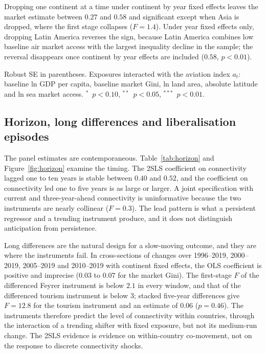 \documentclass[12pt]{article}
\newcommand{\sym}[1]{\ensuremath{^{#1}}}
\begin{document}
Dropping one continent at a time under continent by year fixed effects leaves the market estimate between $0.27$ and $0.58$ and significant except when Asia is dropped, where the first stage collapses ($F=1.4$). Under year fixed effects only, dropping Latin America reverses the sign, because Latin America combines low baseline air market access with the largest inequality decline in the sample; the reversal disappears once continent by year effects are included ($0.58$, $p<0.01$).

\begin{table}[H]\centering\caption{Identification diagnostics for the shift-share instruments.}\label{tab:diag}
\begin{threeparttable}\small
\begin{tablenotes}\footnotesize\item Robust SE in parentheses. Exposures interacted with the aviation index $a_t$: baseline ln GDP per capita, baseline market Gini, ln land area, absolute latitude and ln sea market access. \sym{*}~$p<0.10$, \sym{**}~$p<0.05$, \sym{***}~$p<0.01$.\end{tablenotes}\end{threeparttable}\end{table}

\subsection{Horizon, long differences and liberalisation episodes}
\label{sec:horizon}
The panel estimates are contemporaneous. Table~\ref{tab:horizon} and Figure~\ref{fig:horizon} examine the timing. The 2SLS coefficient on connectivity lagged one to ten years is stable between $0.40$ and $0.52$, and the coefficient on connectivity led one to five years is as large or larger. A joint specification with current and three-year-ahead connectivity is uninformative because the two instruments are nearly collinear ($F=0.3$). The lead pattern is what a persistent regressor and a trending instrument produce, and it does not distinguish anticipation from persistence.

Long differences are the natural design for a slow-moving outcome, and they are where the instruments fail. In cross-sections of changes over 1996--2019, 2000--2019, 2005--2019 and 2010--2019 with continent fixed effects, the OLS coefficient is positive and imprecise ($0.03$ to $0.07$ for the market Gini). The first-stage $F$ of the differenced Feyrer instrument is below $2.1$ in every window, and that of the differenced tourism instrument is below $3$; stacked five-year differences give $F=12.8$ for the tourism instrument and an estimate of $0.06$ ($p=0.46$). The instruments therefore predict the level of connectivity within countries, through the interaction of a trending shifter with fixed exposure, but not its medium-run change. The 2SLS evidence is evidence on within-country co-movement, not on the response to discrete connectivity shocks.
\end{document}
